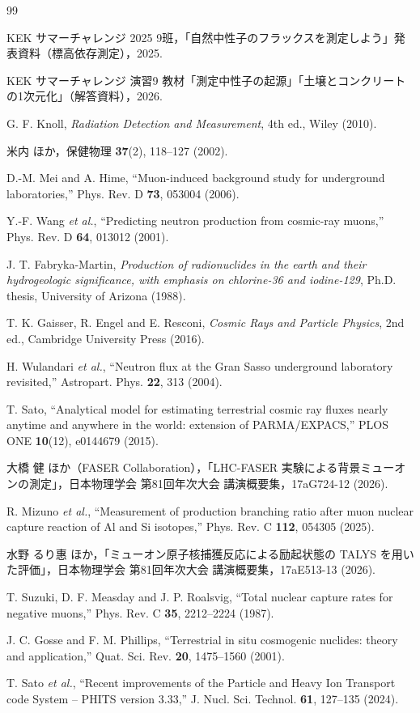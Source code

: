 \documentclass[a4paper,11pt]{ltjsarticle}
\begin{document}
\begin{thebibliography}{99}

KEK サマーチャレンジ 2025 9班，「自然中性子のフラックスを測定しよう」発表資料（標高依存測定），2025.

KEK サマーチャレンジ 演習9 教材「測定中性子の起源」「土壌とコンクリートの1次元化」（解答資料），2026.

G. F. Knoll, \textit{Radiation Detection and Measurement}, 4th ed., Wiley (2010).

米内 ほか，保健物理 \textbf{37}(2), 118--127 (2002).

D.-M. Mei and A. Hime, ``Muon-induced background study for underground laboratories,''
Phys. Rev. D \textbf{73}, 053004 (2006).

Y.-F. Wang \textit{et al.}, ``Predicting neutron production from cosmic-ray muons,''
Phys. Rev. D \textbf{64}, 013012 (2001).

J. T. Fabryka-Martin, \textit{Production of radionuclides in the earth and their hydrogeologic significance, with emphasis on chlorine-36 and iodine-129}, Ph.D. thesis, University of Arizona (1988).

T. K. Gaisser, R. Engel and E. Resconi, \textit{Cosmic Rays and Particle Physics}, 2nd ed., Cambridge University Press (2016).

H. Wulandari \textit{et al.}, ``Neutron flux at the Gran Sasso underground laboratory revisited,''
Astropart. Phys. \textbf{22}, 313 (2004).

T. Sato, ``Analytical model for estimating terrestrial cosmic ray fluxes nearly anytime and anywhere in the world: extension of PARMA/EXPACS,''
PLOS ONE \textbf{10}(12), e0144679 (2015).

大橋 健 ほか（FASER Collaboration），「LHC-FASER 実験による背景ミューオンの測定」，日本物理学会 第81回年次大会 講演概要集，17aG724-12 (2026).

R. Mizuno \textit{et al.}, ``Measurement of production branching ratio after muon nuclear capture reaction of Al and Si isotopes,''
Phys. Rev. C \textbf{112}, 054305 (2025).

水野 るり惠 ほか，「ミューオン原子核捕獲反応による励起状態の TALYS を用いた評価」，日本物理学会 第81回年次大会 講演概要集，17aE513-13 (2026).

T. Suzuki, D. F. Measday and J. P. Roalsvig, ``Total nuclear capture rates for negative muons,''
Phys. Rev. C \textbf{35}, 2212--2224 (1987).

J. C. Gosse and F. M. Phillips, ``Terrestrial in situ cosmogenic nuclides: theory and application,''
Quat. Sci. Rev. \textbf{20}, 1475--1560 (2001).

T. Sato \textit{et al.}, ``Recent improvements of the Particle and Heavy Ion Transport code System -- PHITS version 3.33,''
J. Nucl. Sci. Technol. \textbf{61}, 127--135 (2024).

\end{thebibliography}
\end{document}
